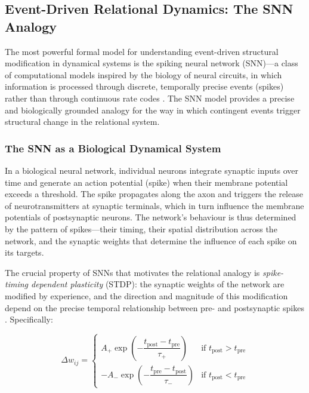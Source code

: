 \subsection{Event-Driven Relational Dynamics: The SNN Analogy}
\label{p14:subsec:snn}

\noindent
The most powerful formal model for understanding event-driven structural modification in dynamical systems is the spiking neural network (SNN)---a class of computational models inspired by the biology of neural circuits, in which information is processed through discrete, temporally precise events (spikes) rather than through continuous rate codes \parencite{maass1997,gerstner1996}. The SNN model provides a precise and biologically grounded analogy for the way in which contingent events trigger structural change in the relational system.

\subsubsection{The SNN as a Biological Dynamical System}
\label{p14:subsubsec:snnbio}

\noindent
In a biological neural network, individual neurons integrate synaptic inputs over time and generate an action potential (spike) when their membrane potential exceeds a threshold. The spike propagates along the axon and triggers the release of neurotransmitters at synaptic terminals, which in turn influence the membrane potentials of postsynaptic neurons. The network's behaviour is thus determined by the pattern of spikes---their timing, their spatial distribution across the network, and the synaptic weights that determine the influence of each spike on its targets.

The crucial property of SNNs that motivates the relational analogy is \emph{spike-timing dependent plasticity} (STDP): the synaptic weights of the network are modified by experience, and the direction and magnitude of this modification depend on the precise temporal relationship between pre- and postsynaptic spikes \parencite{bi1998}. Specifically:

\begin{equation}
\Delta w_{ij} = \begin{cases}
A_+ \exp\!\left(-\dfrac{t_{\mathrm{post}} - t_{\mathrm{pre}}}{\tau_+}\right) & \text{if } t_{\mathrm{post}} > t_{\mathrm{pre}} \\[6pt]
-A_- \exp\!\left(-\dfrac{t_{\mathrm{pre}} - t_{\mathrm{post}}}{\tau_-}\right) & \text{if } t_{\mathrm{post}} < t_{\mathrm{pre}}
\end{cases}
\end{equation}


